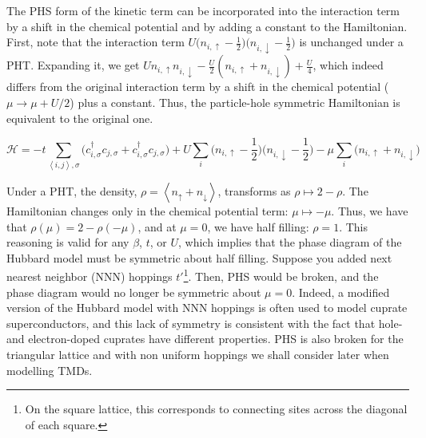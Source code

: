 The \ac{PHS} form of the kinetic term can be incorporated into the interaction term by a shift in the chemical potential and by adding a constant to the Hamiltonian.
First, note that the interaction term $
U \big( n_{i,\uparrow} - \frac{1}{2} \big) \big( n_{i,\downarrow} - \frac{1}{2} \big)
$
is unchanged under a \ac{PHT}.
Expanding it, we get $U n_{i,\uparrow} n_{i,\downarrow} - \frac{U}{2} (n_{i,\uparrow} + n_{i,\downarrow}) + \frac{U}{4}$, which indeed differs from the original interaction term by a shift in the chemical potential ($\mu \rightarrow \mu + U / 2$) plus a constant.
Thus, the particle-hole symmetric Hamiltonian is equivalent to the original one.

\begin{equation}
\mathcal{H} = -t \sum_{\left\langle i, j \right \rangle, \sigma} \bigg( c_{i,\sigma}^\dagger c_{j,\sigma} + c_{i,\sigma}^\dagger c_{j,\sigma} \bigg) + U \sum_{i} \bigg( n_{i,\uparrow} - \frac{1}{2} \bigg) \bigg( n_{i,\downarrow} - \frac{1}{2} \bigg) -\mu \sum_i \bigg( n_{i,\uparrow} + n_{i,\downarrow} \bigg)
\end{equation}

Under a \ac{PHT}, the density, $\rho = \left\langle n_\uparrow + n_\downarrow \right\rangle$, transforms as $\rho \mapsto 2 - \rho$.
The Hamiltonian changes only in the chemical potential term: $\mu \mapsto -\mu$.
Thus, we have that $\rho (\mu) = 2 - \rho (-\mu)$, and at $\mu = 0$, we have half filling: $\rho = 1$.
This reasoning is valid for any $\beta$, $t$, or $U$, which implies that the phase diagram of the Hubbard model must be symmetric about half filling.
Suppose you added next nearest neighbor (NNN) hoppings $t'$\footnote{On the square lattice, this corresponds to connecting sites across the diagonal of each square.}.
Then, \ac{PHS} would be broken, and the phase diagram would no longer be symmetric about $\mu = 0$.
Indeed, a modified version of the Hubbard model with NNN hoppings is often used to model cuprate superconductors, and this lack of symmetry is consistent with the fact that hole- and electron-doped cuprates have different properties. 
\ac{PHS} is also broken for the triangular lattice and with non uniform hoppings we shall consider later when modelling \acp{TMD}.